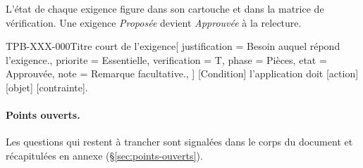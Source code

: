 L'état de chaque exigence figure dans son cartouche et dans la matrice de
vérification. Une exigence \textit{Proposée} devient \textit{Approuvée} à la relecture.

\begin{exigence*}{TPB-XXX-000}{Titre court de l'exigence}[
    justification = {Besoin auquel répond l'exigence.},
    priorite      = {Essentielle},
    verification  = {T},
    phase         = {Pièces},
    etat          = {Approuvée},
    note          = {Remarque facultative.},
  ]
  [Condition] l'application doit [action] [objet] [contrainte].
\end{exigence*}

\paragraph{Points ouverts.} Les questions qui restent à trancher sont signalées dans
le corps du document et récapitulées en annexe (§\ref{sec:points-ouverts}).
